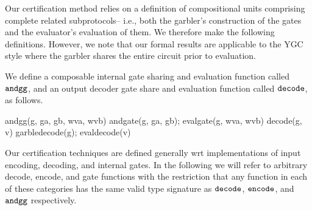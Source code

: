 Our certification method relies on a definition of compositional units comprising
complete related subprotocols-- i.e., both the garbler's
construction of the gates and the evaluator's evaluation of them. We
therefore make the following definitions. However, we note that our
formal results are applicable to the YGC style where the garbler
shares the entire circuit prior to evaluation.
\begin{definition}
  \label{ygc-modules}
  We define a composable internal  gate sharing and evaluation function
  called $\texttt{andgg}$, and an output decoder gate share and evaluation function called
  $\texttt{decode}$, as follows. 
\begin{verbatimtab}
  andgg(g, ga, gb, wva, wvb) { andgate(g, ga, gb); evalgate(g, wva, wvb) }
  decode(g, v) { garbledecode(g); evaldecode(v) }
\end{verbatimtab}
\end{definition}

Our certification techniques are defined generally wrt implementations
of input encoding, decoding, and internal gates. In the following we
will refer to arbitrary decode, encode, and gate functions with the
restriction that any function in each of these categories has the same
valid type signature as $\texttt{decode}$, $\texttt{encode}$, and
$\texttt{andgg}$ respectively.

